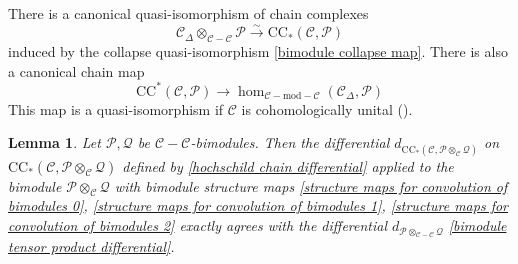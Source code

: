 \documentclass[11pt]{amsproc}
\def\cP{\mathcal{P}}
\def\cQ{\mathcal{Q}}
\def\cc{\mathcal{C}}
\def\bimod{\mathrm{\!-\! mod\!-\!}}
\def\r#1{\mathrm{#1}}
\def\D{\Delta}
\newtheorem{lem}{Lemma}[section]
\theoremstyle{remark}
\numberwithin{equation}{section}
\begin{document}
There is a canonical quasi-isomorphism of chain complexes
\begin{equation}\label{2pt to 1pt}
\cc_{\D} \otimes_{\cc-\cc} \cP \stackrel{\sim}\to \r{CC}_{*}(\cc, \cP) 
\end{equation}
induced by the collapse quasi-isomorphism \eqref{bimodule collapse map}.
There is also a canonical chain map
\begin{equation}\label{1pt to 2pt}
\r{CC}^{*}(\cc, \cP) \to \hom_{\cc \bimod \cc}(\cc_{\D}, \cP)
\end{equation}
This map is a quasi-isomorphism if $\cc$ is cohomologically unital (\cite[Proposition 2.5]{ganatra}).

\begin{lem}\label{lem: cc is bimodule tensor product}
Let $\cP, \cQ$ be $\cc-\cc$-bimodules. 
Then the differential $d_{\r{CC}_{*}(\cc, \cP \otimes_{\cc} \cQ)}$ on $\r{CC}_{*}(\cc, \cP \otimes_{\cc} \cQ)$ defined by \eqref{hochschild chain differential} applied to the bimodule $\cP \otimes_{\cc} \cQ$ with bimodule structure maps \eqref{structure maps for convolution of bimodules 0}, \eqref{structure maps for convolution of bimodules 1}, \eqref{structure maps for convolution of bimodules 2} exactly agrees with the differential $d_{\cP \otimes_{\cc - \cc} \cQ}$ \eqref{bimodule tensor product differential}.
\end{lem}
\end{document}
